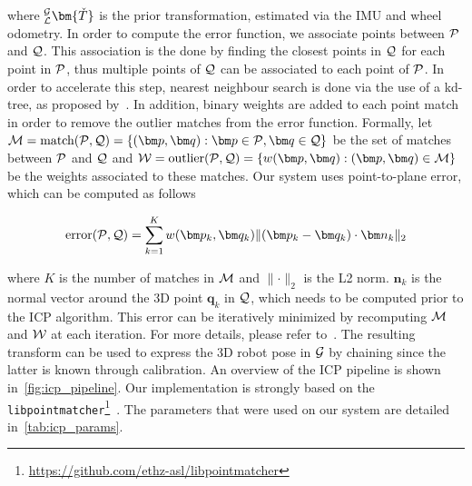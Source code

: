 where $_{\lidarf}^{\mapf}\bm{\check{T}}$ is the prior transformation, estimated via the \ac{IMU} and wheel odometry.
In order to compute the error function, we associate points between $\mathcal{P}$ and $\mathcal{Q}$.
This association is the done by finding the closest points in $\mathcal{Q}$ for each point in $\mathcal{P}$, thus multiple points of $\mathcal{Q}$ can be associated to each point of $\mathcal{P}$.
In order to accelerate this step, nearest neighbour search is done via the use of a kd-tree, as proposed by~\citet{Elseberg2012}.
In addition, binary weights are added to each point match in order to remove the outlier matches from the error function.
Formally, let $\match = \text{match}(\readpc, \refpc) = \{(\bm p, \bm q) : \bm p \in \readpc, \bm q \in \refpc \}$ be the set of matches between $\mathcal{P}$ and $\mathcal{Q}$ and $\weight = \text{outlier}(\readpc, \refpc) = \{w(\bm p, \bm q) : (\bm p, \bm q) \in \match\}$ be the weights associated to these matches.
Our system uses point-to-plane error, which can be computed as follows

\begin{equation}
	\text{error}(\readpc, \refpc) = \sum_{k=1}^{K} w(\bm p_k, \bm q_k) \lVert (\bm p_k - \bm q_k) \cdot \bm n_k \rVert_2
\end{equation}

where $K$ is the number of matches in $\mathcal{M}$ and $\lVert \cdot \rVert_2$ is the L2 norm.
$\bm n_k$ is the normal vector around the 3D point $\bm q_k$ in $\mathcal{Q}$, which needs to be computed prior to the \ac{ICP} algorithm.
This error can be iteratively minimized by recomputing $\mathcal{M}$ and $\mathcal{W}$ at each iteration.
For more details, please refer to~\citep{Pomerleau2015}.
The resulting transform \transform{\lidarf}{\mapf} can be used to express the 3D robot pose in $\mathcal{G}$ by chaining \transform{\lidarf}{\mapf} \transform{\robotf}{\lidarf} since the latter is known through calibration.
An overview of the \ac{ICP} pipeline is shown in~\autoref{fig:icp_pipeline}.
Our implementation is strongly based on the \texttt{libpointmatcher}\footnote{\url{https://github.com/ethz-asl/libpointmatcher}}~\citep{Pomerleau2013}.
The parameters that were used on our system are detailed in~\autoref{tab:icp_params}.

